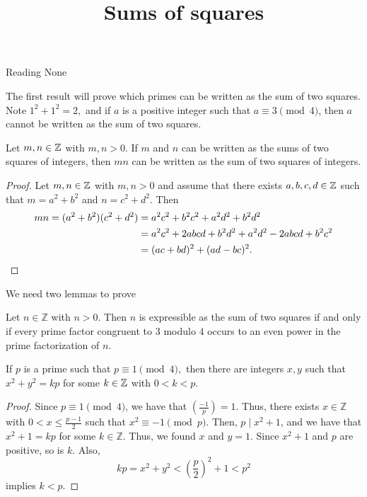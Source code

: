 \documentclass{ximera}
\title{Sums of squares}
\begin{document}
\begin{abstract}
\end{abstract}
\maketitle


\begin{pre}
    \item[Reading] None
\end{pre}

The first result will prove which primes can be written as the sum of two squares. Note $1^2+1^2=2,$ and if $a$ is a positive integer such that $a\equiv 3 \pmod 4$, then $a$ cannot be written as the sum of two squares.


\begin{proposition}\label{prop:prod-sum-squares}
 Let $m,n\in\mathbb Z$ with $m,n>0$. If $m$ and $n$ can be written as the sums of two squares of integers, then $mn$ can be written as the sum of two squares of integers.

 \begin{proof}
	Let $m,n\in\mathbb Z$ with $m,n>0$ and assume that there exists $a,b,c,d\in\mathbb Z$ such that $m=a^2+b^2$ and $n=c^2+d^2.$ Then 
	\begin{align*}
		mn=(a^2+b^2)(c^2+d^2)&=a^2c^2+b^2c^2+a^2d^2+b^2d^2\\
		&=a^2c^2+2abcd+b^2d^2+a^2d^2-2abcd+b^2c^2\\
		&=(ac+bd)^2+(ad-bc)^2.\qedhere
	\end{align*}
 \end{proof}
\end{proposition}

We need two lemmas to prove 
\begin{theorem}\label{thm:express-sum-sqrs}
	Let $n\in\mathbb{Z}$ with $n>0$. Then $n$ is expressible as the sum of two squares if and only if every prime factor congruent to $3$ modulo  $4$ occurs to an even power in the prime factorization of $n$.
\end{theorem}

\begin{lemma}\label{lem:prime-sum-sqrs}
	If $p$ is a prime such that $p\equiv 1\pmod{4},$ then there are integers $x,y$ such that $x^2+y^2=kp$ for some $k\in\mathbb Z$ with $0<k<p.$

	\begin{proof}
		Since $p\equiv 1 \pmod 4$, we have that $\left(\frac{-1}{p}\right)=1$. Thus, there exists $x\in\mathbb{Z}$ with $0<x\leq\frac{p-1}{2}$ such that $x^2\equiv -1 \pmod p$. Then, $p\mid x^2+1$, and we have that $x^2+1=kp$ for some $k\in\mathbb{Z}$. Thus, we found $x$ and $y=1$. Since $x^2+1$ and $p$ are positive, so is $k$. Also, \[kp=x^2+y^2<\left(\frac{p}{2}\right)^2+1<p^2\] implies $k<p$.
	\end{proof}
\end{lemma}
\end{document}
